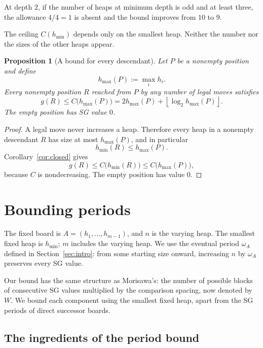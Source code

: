 \documentclass[10pt,a4paper]{article}
\newtheorem{proposition}[theorem]{Proposition}
\begin{document}
At depth $2$, if the number of heaps at minimum depth is odd
and at least three, the allowance $4/4=1$ is absent and the
bound improves from $10$ to $9$.

The ceiling $C(h_{\min})$ depends only on the smallest heap.
Neither the number nor the sizes of the other heaps appear.

\begin{proposition}[A bound for every descendant]
\label{prop:descendantbound}
Let $P$ be a nonempty position and define
\[
 h_{\max}(P):=\max_i h_i.
\]
Every nonempty position $R$ reached from $P$ by any number of
legal moves satisfies
\begin{equation}
 \boxed{
 g(R)\le C\bigl(h_{\max}(P)\bigr)
 =
 2h_{\max}(P)
 +\left\lfloor\log_2 h_{\max}(P)\right\rfloor.
 }
 \label{eq:descendantbound}
\end{equation}
The empty position has SG value $0$.
\end{proposition}

\begin{proof}
A legal move never increases a heap. Therefore every heap in a
nonempty descendant $R$ has size at most $h_{\max}(P)$, and in
particular
\[
 h_{\min}(R)\le h_{\max}(P).
\]
Corollary~\ref{cor:closed} gives
\[
 g(R)\le C\bigl(h_{\min}(R)\bigr)
 \le C\bigl(h_{\max}(P)\bigr),
\]
because $C$ is nondecreasing. The empty position has value $0$.
\end{proof}



\section{Bounding periods}
\label{sec:periods}

The fixed board is $A=(h_1,\ldots,h_{m-1})$, and $n$ is the
varying heap. The smallest fixed heap is $h_{\min}$; $m$ includes
the varying heap. We use the eventual period $\omega_A$ defined
in Section~\ref{sec:intro}: from some starting size onward,
increasing $n$ by $\omega_A$ preserves every SG value.

Our bound has the same structure as Morisawa's: the number of
possible blocks of consecutive SG values multiplied by the
comparison spacing, now denoted by $W$. We bound each component
using the smallest fixed heap, apart from the SG periods of
direct successor boards.

\subsection{The ingredients of the period bound}
\end{document}
